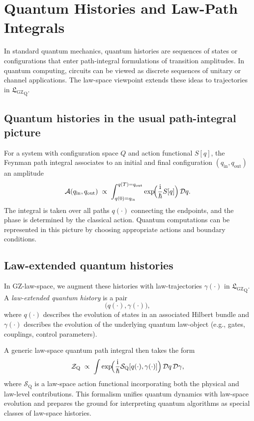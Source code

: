 \documentclass[11pt]{book}
\newcommand{\GZLS}{\ensuremath{\mathfrak{L}_{\mathrm{GZ}}}}
\theoremstyle{plain}
\theoremstyle{definition}
\theoremstyle{remark}
\begin{document}
\section{Quantum Histories and Law-Path Integrals}
\label{sec:q-histories-lawpaths}


In standard quantum mechanics, quantum histories are sequences of
states or configurations that enter path-integral formulations of
transition amplitudes. In quantum computing, circuits can be viewed
as discrete sequences of unitary or channel applications. The
law-space viewpoint extends these ideas to trajectories in
${\GZLS}_{\mathrm{Q}}$.

\subsection*{Quantum histories in the usual path-integral picture}

For a system with configuration space $Q$ and action functional
$S[q]$, the Feynman path integral associates to an initial and final
configuration $(q_{\mathrm{in}},q_{\mathrm{out}})$ an amplitude
\[
   \mathcal{A}(q_{\mathrm{in}},q_{\mathrm{out}})
   \;\propto\;
   \int_{q(0)=q_{\mathrm{in}}}^{q(T)=q_{\mathrm{out}}}
   \exp\!\Bigl(\frac{\mathrm{i}}{\hbar} S[q]\Bigr)\,\mathcal{D}q.
\]
The integral is taken over all paths $q(\cdot)$ connecting the
endpoints, and the phase is determined by the classical action.
Quantum computations can be represented in this picture by choosing
appropriate actions and boundary conditions.

\subsection*{Law-extended quantum histories}

In GZ-law-space, we augment these histories with law-trajectories
$\gamma(\cdot)$ in ${\GZLS}_{\mathrm{Q}}$. A \emph{law-extended
quantum history} is a pair
\[
   \bigl(q(\cdot),\gamma(\cdot)\bigr),
\]
where $q(\cdot)$ describes the evolution of states in an associated
Hilbert bundle and $\gamma(\cdot)$ describes the evolution of the
underlying quantum law-object (e.g., gates, couplings, control
parameters).

A generic law-space quantum path integral then takes the form
\[
   \mathcal{Z}_{\mathrm{Q}}
   \;\propto\;
   \int \exp\!\Bigl(\frac{\mathrm{i}}{\hbar}
   \mathcal{S}_{\mathrm{Q}}[q(\cdot),\gamma(\cdot)]\Bigr)\,
   \mathcal{D}q\,\mathcal{D}\gamma,
\]
where $\mathcal{S}_{\mathrm{Q}}$ is a law-space action functional
incorporating both the physical and law-level contributions. This
formalism unifies quantum dynamics with law-space evolution and
prepares the ground for interpreting quantum algorithms as special
classes of law-space histories.
\end{document}
